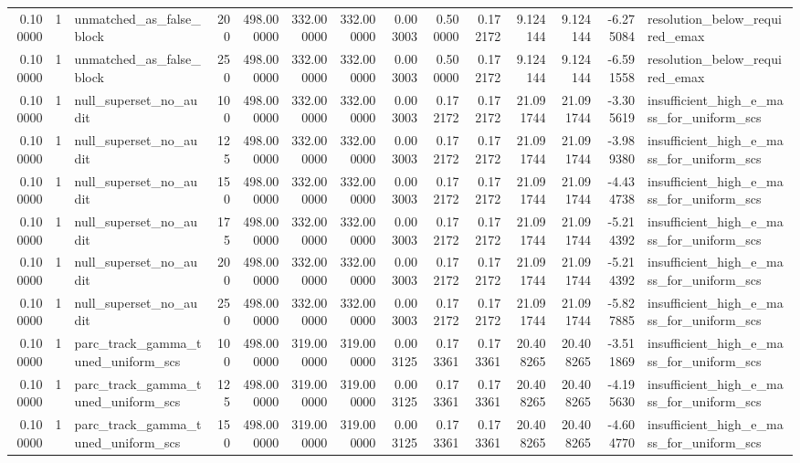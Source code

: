 \begin{tabular}{rrlrrrrrrrrrrl}
0.100000 & 1 & unmatched_as_false_block & 200 & 498.000000 & 332.000000 & 332.000000 & 0.003003 & 0.500000 & 0.172172 & 9.124144 & 9.124144 & -6.275084 & resolution_below_required_emax \\
0.100000 & 1 & unmatched_as_false_block & 250 & 498.000000 & 332.000000 & 332.000000 & 0.003003 & 0.500000 & 0.172172 & 9.124144 & 9.124144 & -6.591558 & resolution_below_required_emax \\
0.100000 & 1 & null_superset_no_audit & 100 & 498.000000 & 332.000000 & 332.000000 & 0.003003 & 0.172172 & 0.172172 & 21.091744 & 21.091744 & -3.305619 & insufficient_high_e_mass_for_uniform_scs \\
0.100000 & 1 & null_superset_no_audit & 125 & 498.000000 & 332.000000 & 332.000000 & 0.003003 & 0.172172 & 0.172172 & 21.091744 & 21.091744 & -3.989380 & insufficient_high_e_mass_for_uniform_scs \\
0.100000 & 1 & null_superset_no_audit & 150 & 498.000000 & 332.000000 & 332.000000 & 0.003003 & 0.172172 & 0.172172 & 21.091744 & 21.091744 & -4.434738 & insufficient_high_e_mass_for_uniform_scs \\
0.100000 & 1 & null_superset_no_audit & 175 & 498.000000 & 332.000000 & 332.000000 & 0.003003 & 0.172172 & 0.172172 & 21.091744 & 21.091744 & -5.214392 & insufficient_high_e_mass_for_uniform_scs \\
0.100000 & 1 & null_superset_no_audit & 200 & 498.000000 & 332.000000 & 332.000000 & 0.003003 & 0.172172 & 0.172172 & 21.091744 & 21.091744 & -5.214392 & insufficient_high_e_mass_for_uniform_scs \\
0.100000 & 1 & null_superset_no_audit & 250 & 498.000000 & 332.000000 & 332.000000 & 0.003003 & 0.172172 & 0.172172 & 21.091744 & 21.091744 & -5.827885 & insufficient_high_e_mass_for_uniform_scs \\
0.100000 & 1 & parc_track_gamma_tuned_uniform_scs & 100 & 498.000000 & 319.000000 & 319.000000 & 0.003125 & 0.173361 & 0.173361 & 20.408265 & 20.408265 & -3.511869 & insufficient_high_e_mass_for_uniform_scs \\
0.100000 & 1 & parc_track_gamma_tuned_uniform_scs & 125 & 498.000000 & 319.000000 & 319.000000 & 0.003125 & 0.173361 & 0.173361 & 20.408265 & 20.408265 & -4.195630 & insufficient_high_e_mass_for_uniform_scs \\
0.100000 & 1 & parc_track_gamma_tuned_uniform_scs & 150 & 498.000000 & 319.000000 & 319.000000 & 0.003125 & 0.173361 & 0.173361 & 20.408265 & 20.408265 & -4.604770 & insufficient_high_e_mass_for_uniform_scs \\

\end{tabular}

